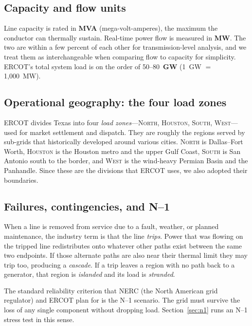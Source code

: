 \documentclass[12pt,letterpaper]{article}
\begin{document}
\subsection{Capacity and flow units}

Line capacity is rated in \textbf{MVA} (mega-volt-amperes), the maximum the conductor can thermally sustain. Real-time power flow is measured in \textbf{MW}. The two are within a few percent of each other for transmission-level analysis, and we treat them as interchangeable when comparing flow to capacity for simplicity. ERCOT's total system load is on the order of 50--80~\textbf{GW} (1~GW $=$ 1{,}000~MW).

\subsection{Operational geography: the four load zones}

ERCOT divides Texas into four \emph{load zones}---\textsc{North}, \textsc{Houston}, \textsc{South}, \textsc{West}---used for market settlement and dispatch. They are roughly the regions served by sub-grids that historically developed around various cities. \textsc{North} is Dallas--Fort Worth, \textsc{Houston} is the Houston metro and the upper Gulf Coast, \textsc{South} is San Antonio south to the border, and \textsc{West} is the wind-heavy Permian Basin and the Panhandle. Since these are the divisions that ERCOT uses, we also adopted their boundaries.

\subsection{Failures, contingencies, and N--1}

When a line is removed from service due to a fault, weather, or planned maintenance, the industry term is that the line \emph{trips}. Power that was flowing on the tripped line redistributes onto whatever other paths exist between the same two endpoints. If those alternate paths are also near their thermal limit they may trip too, producing a \emph{cascade}. If a trip leaves a region with no path back to a generator, that region is \emph{islanded} and its load is \emph{stranded}.

The standard reliability criterion that NERC (the North American grid regulator) and ERCOT plan for is the N--1 scenario. The grid must survive the loss of any single component without dropping load. Section~\ref{sec:n1} runs an N--1 stress test in this sense.
\end{document}
